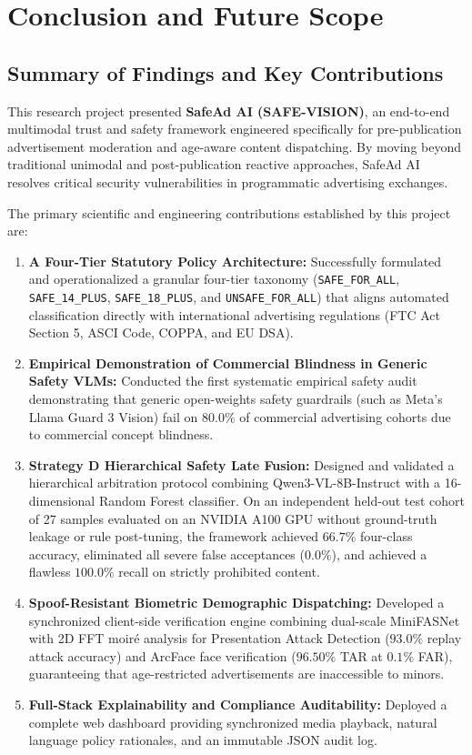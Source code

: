 \documentclass[12pt,a4paper]{report}
\begin{document}
\chapter{Conclusion and Future Scope}
\label{ch:conclusion}

\section{Summary of Findings and Key Contributions}
This research project presented \textbf{SafeAd AI (SAFE-VISION)}, an end-to-end multimodal trust and safety framework engineered specifically for pre-publication advertisement moderation and age-aware content dispatching. By moving beyond traditional unimodal and post-publication reactive approaches, SafeAd AI resolves critical security vulnerabilities in programmatic advertising exchanges.

The primary scientific and engineering contributions established by this project are:
\begin{enumerate}
    \item \textbf{A Four-Tier Statutory Policy Architecture:} Successfully formulated and operationalized a granular four-tier taxonomy (\texttt{SAFE\_FOR\_ALL}, \texttt{SAFE\_14\_PLUS}, \texttt{SAFE\_18\_PLUS}, and \texttt{UNSAFE\_FOR\_ALL}) that aligns automated classification directly with international advertising regulations (FTC Act Section 5, ASCI Code, COPPA, and EU DSA).
    \item \textbf{Empirical Demonstration of Commercial Blindness in Generic Safety VLMs:} Conducted the first systematic empirical safety audit demonstrating that generic open-weights safety guardrails (such as Meta's Llama Guard 3 Vision) fail on $80.0\%$ of commercial advertising cohorts due to commercial concept blindness.
    \item \textbf{Strategy D Hierarchical Safety Late Fusion:} Designed and validated a hierarchical arbitration protocol combining Qwen3-VL-8B-Instruct with a 16-dimensional Random Forest classifier. On an independent held-out test cohort of 27 samples evaluated on an NVIDIA A100 GPU without ground-truth leakage or rule post-tuning, the framework achieved $66.7\%$ four-class accuracy, eliminated all severe false acceptances ($0.0\%$), and achieved a flawless $100.0\%$ recall on strictly prohibited content.
    \item \textbf{Spoof-Resistant Biometric Demographic Dispatching:} Developed a synchronized client-side verification engine combining dual-scale MiniFASNet with 2D FFT moir\'{e} analysis for Presentation Attack Detection ($93.0\%$ replay attack accuracy) and ArcFace face verification ($96.50\%$ TAR at $0.1\%$ FAR), guaranteeing that age-restricted advertisements are inaccessible to minors.
    \item \textbf{Full-Stack Explainability and Compliance Auditability:} Deployed a complete web dashboard providing synchronized media playback, natural language policy rationales, and an immutable JSON audit log.
\end{enumerate}
\end{document}
